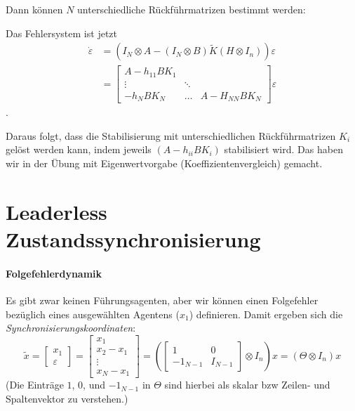Dann können $N$ unterschiedliche Rückführmatrizen bestimmt werden:

Das Fehlersystem ist jetzt
\begin{align}
    \dot{\varepsilon} &= (I_N \otimes A - (I_N \otimes B)\tilde{K}(H \otimes I_n))\varepsilon \\
    &= \begin{bmatrix}
        A-h_{11}BK_1 & & \\
        \vdots & \ddots & \\
        -h_N B K_N & \dots & A-H_{NN} BK_N
    \end{bmatrix} \varepsilon
\end{align}.

Daraus folgt, dass die Stabilisierung mit unterschiedlichen Rückführmatrizen $K_i$
gelöst werden kann, indem jeweils $(A-h_{ii}BK_i)$ stabilisiert wird.
Das haben wir in der Übung mit Eigenwertvorgabe (Koeffizientenvergleich) gemacht.

\section{Leaderless Zustandssynchronisierung}
\paragraph{Folgefehlerdynamik}
Es gibt zwar keinen Führungsagenten, aber wir können einen Folgefehler
bezüglich eines ausgewählten Agentens ($x_1$) definieren.
Damit ergeben sich die \emph{Synchronisierungskoordinaten}:
\begin{equation}
    \tilde{x} = \begin{bmatrix}
        x_1 \\
        \varepsilon
    \end{bmatrix}
    = \begin{bmatrix}
        x_1 \\
        x_2 - x_1 \\
        \vdots \\
        x_N - x_1
    \end{bmatrix}
    = \left(\begin{bmatrix}
        1 & 0 \\
        -1_{N-1} & I_{N-1}
    \end{bmatrix}
    \otimes I_n
    \right) x
    = (\Theta \otimes I_n)x
\end{equation}
(Die Einträge $1$, $0$, und $-1_{N-1}$ in $\Theta$ sind hierbei als skalar bzw Zeilen- und Spaltenvektor zu verstehen.)

